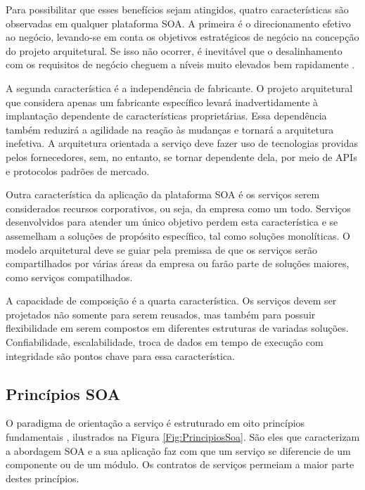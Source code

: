 Para possibilitar que esses benefícios sejam atingidos, quatro características
são observadas em qualquer plataforma SOA. A primeira é o direcionamento
efetivo ao negócio, levando-se em conta os objetivos estratégicos de negócio na
concepção do projeto arquitetural. Se isso não ocorrer, é inevitável que o
desalinhamento com os requisitos de negócio cheguem a níveis muito elevados
bem rapidamente \cite{erl2008soaDesigPatterns}.

A segunda característica é a independência de fabricante. O projeto arquitetural
que considera apenas um fabricante específico levará inadvertidamente à
implantação dependente de características proprietárias. Essa dependência também
reduzirá a agilidade na reação às mudanças e tornará a arquitetura inefetiva. A
arquitetura orientada a serviço deve fazer uso de tecnologias providas pelos
fornecedores, sem, no entanto, se tornar dependente dela, por meio de APIs e
protocolos padrões de mercado.

Outra característica da aplicação da plataforma SOA é os serviços serem
considerados recursos corporativos, ou seja, da empresa como um todo. Serviços
desenvolvidos para atender um único objetivo perdem esta característica e se
assemelham a soluções de propósito específico, tal como soluções monolíticas. O
modelo arquitetural deve se guiar pela premissa de que os serviços serão
compartilhados por várias áreas da empresa ou farão parte de soluções maiores,
como serviços compatilhados.

A capacidade de composição é a quarta característica. Os serviços devem ser
projetados não somente para serem reusados, mas também para possuir
flexibilidade em serem compostos em diferentes estruturas de variadas
soluções. Confiabilidade, escalabilidade, troca de dados em tempo de execução
com integridade são pontos chave para essa característica.



\subsection{Princípios SOA}
\label{PrincipiosSOA} 
\vspace{-6mm}

O paradigma de orientação a serviço é estruturado em oito princípios
fundamentais \cite{erl2009web}, ilustrados na Figura \ref{Fig:PrincipiosSoa}. São eles que
caracterizam a abordagem SOA e a sua aplicação faz com que um serviço se
diferencie de um componente ou de um módulo. Os contratos de serviços permeiam a maior parte destes princípios.

